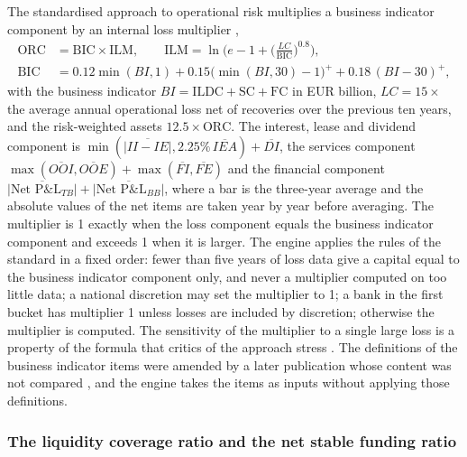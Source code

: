 The standardised approach to operational risk multiplies a business indicator component by an internal loss multiplier \citep{ccr:ope25},
\begin{equation}
\begin{aligned}
\mathrm{ORC}&=\mathrm{BIC}\times\mathrm{ILM},\qquad \mathrm{ILM}=\ln\!\Big(e-1+\Big(\frac{LC}{\mathrm{BIC}}\Big)^{0.8}\Big),\\
\mathrm{BIC}&=0.12\min(BI,1)+0.15\big(\min(BI,30)-1\big)^{+}+0.18\,(BI-30)^{+},
\end{aligned}
\label{eq:ccr-sma}
\end{equation}
with the business indicator $BI=\mathrm{ILDC}+\mathrm{SC}+\mathrm{FC}$ in EUR billion, $LC=15\times$ the average annual operational loss net of recoveries over the previous ten years, and the risk-weighted assets $12.5\times\mathrm{ORC}$. The interest, lease and dividend component is $\min(\overline{|II-IE|},2.25\%\,\overline{IEA})+\overline{DI}$, the services component $\max(\overline{OOI},\overline{OOE})+\max(\overline{FI},\overline{FE})$ and the
financial component $\overline{|\text{Net P\&L}_{TB}|}+\overline{|\text{Net P\&L}_{BB}|}$, where a bar is the three-year average and the absolute values of the net items are taken year by year before averaging. The multiplier is 1 exactly when the loss component equals the business indicator component and exceeds 1 when it is larger. The engine applies the rules of the standard in a fixed order: fewer than five years of loss data give a capital equal to the
business indicator component only, and never a multiplier computed on too little data; a national discretion may set the multiplier to 1; a bank in the first bucket has multiplier 1 unless losses are included by discretion; otherwise the multiplier is computed. The sensitivity of the multiplier to a single large loss is a property of the formula that critics of the approach stress \citep{oprisk:peters2016}. The
definitions of the business indicator items were amended by a later publication whose content was not compared \citep{ccr:d610}, and the engine takes the items as inputs without applying those definitions.

\subsubsection{The liquidity coverage ratio and the net stable funding ratio}

